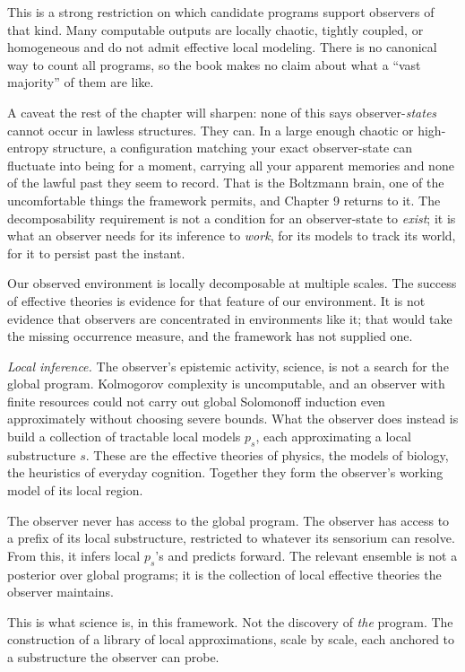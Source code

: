 This is a strong restriction on which candidate programs support observers of that kind. Many computable outputs are locally chaotic, tightly coupled, or homogeneous and do not admit effective local modeling. There is no canonical way to count all programs, so the book makes no claim about what a ``vast majority'' of them are like.

A caveat the rest of the chapter will sharpen: none of this says observer-\emph{states} cannot occur in lawless structures. They can. In a large enough chaotic or high-entropy structure, a configuration matching your exact observer-state can fluctuate into being for a moment, carrying all your apparent memories and none of the lawful past they seem to record. That is the Boltzmann brain, one of the uncomfortable things the framework permits, and Chapter 9 returns to it. The decomposability requirement is not a condition for an observer-state to \emph{exist}; it is what an observer needs for its inference to \emph{work}, for its models to track its world, for it to persist past the instant.

Our observed environment is locally decomposable at multiple scales. The success of effective theories is evidence for that feature of our environment. It is not evidence that observers are concentrated in environments like it; that would take the missing occurrence measure, and the framework has not supplied one.

\emph{Local inference.} The observer's epistemic activity, science, is not a search for the global program. Kolmogorov complexity is uncomputable, and an observer with finite resources could not carry out global Solomonoff induction even approximately without choosing severe bounds. What the observer does instead is build a collection of tractable local models $p_s$, each approximating a local substructure $s$. These are the effective theories of physics, the models of biology, the heuristics of everyday cognition. Together they form the observer's working model of its local region.

The observer never has access to the global program. The observer has access to a prefix of its local substructure, restricted to whatever its sensorium can resolve. From this, it infers local $p_s$'s and predicts forward. The relevant ensemble is not a posterior over global programs; it is the collection of local effective theories the observer maintains.

This is what science is, in this framework. Not the discovery of \emph{the} program. The construction of a library of local approximations, scale by scale, each anchored to a substructure the observer can probe.

